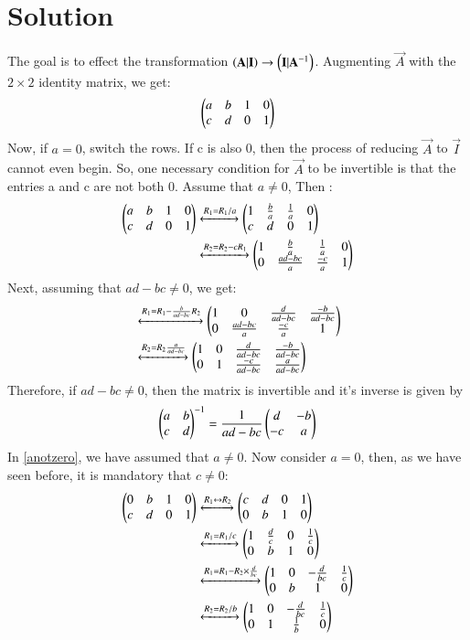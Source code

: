 \documentclass[journal,12pt,twocolumn]{IEEEtran}
\begin{document}
\section{Solution}
The goal is to effect the transformation $\left(\mathbf{A}|\mathbf{I}\right) \rightarrow \left(\mathbf{I}|\mathbf{A}^{-1}\right)$. Augmenting $\vec{A}$ with the $2 \times 2$ identity matrix, we get:
\begin{align}
 \begin{pmatrix}a & b & 1 & 0 \\ c & d & 0 & 1\end{pmatrix} 
\end{align}
Now, if $a = 0$, switch the rows. If c is also 0, then the process of reducing $\vec{A}$ to $\vec{I}$ cannot even begin. So, one necessary condition for $\vec{A}$ to be invertible is that the entries a and c are not both 0. Assume that $a \neq 0$, Then :
\begin{align}
     \label{anotzero}\begin{pmatrix}a & b & 1 & 0 \\ c & d & 0 & 1\end{pmatrix} &\xleftrightarrow{R_1 
= R_1/a} \begin{pmatrix}1 & \frac{b}{a} & \frac{1}{a} & 0 \\ c & d & 0 & 1\end{pmatrix}\\
&\xleftrightarrow{R_2 = R_2 - c R_1} \begin{pmatrix}1 & \frac{b}{a} & \frac{1}{a} & 0 \\ 0 & \frac{ad-bc}{a} & \frac{-c}{a} & 1\end{pmatrix}
\end{align}
Next, assuming that $ad - bc \neq 0$, we get:
\begin{align}
    &\xleftrightarrow{R_1 = R_1 - \frac{b}{ad-bc} R_2} \begin{pmatrix}1 & 0 & \frac{d}{ad-bc} & \frac{-b}{ad-bc} \\ 0 & \frac{ad-bc}{a} & \frac{-c}{a} & 1\end{pmatrix}\\
    &\xleftrightarrow{R_2 = R_2\frac{a}{ad-bc}} \begin{pmatrix}1 & 0 & \frac{d}{ad-bc} & \frac{-b}{ad-bc} \\ 0 & 1 & \frac{-c}{ad-bc} & \frac{a}{ad-bc}\end{pmatrix}
\end{align}
Therefore, if $ad - bc \neq 0$, then the matrix is invertible and it's inverse is given by 
\begin{align}
    \begin{pmatrix}a & b \\ c  & d\end{pmatrix}^{-1} = \frac{1}{ad-bc}\begin{pmatrix}d & -b \\ -c  & a\end{pmatrix}
\end{align}
In \eqref{anotzero}, we have assumed that $a \neq 0$. Now consider $a = 0$, then, as we have seen before, it is mandatory that $c \neq 0$:
\begin{align}
    \begin{pmatrix}0 & b & 1 & 0 \\ c & d & 0 & 1\end{pmatrix} &\xleftrightarrow{R_1\leftrightarrow R_2}  \begin{pmatrix}c & d & 0 & 1 \\ 0 & b & 1 & 0\end{pmatrix} \\
    &\xleftrightarrow{R_1 = R_1/c}\begin{pmatrix}1 & \frac{d}{c} & 0 & \frac{1}{c} \\ 0 & b & 1 & 0\end{pmatrix} \\
    &\xleftrightarrow{R_1 = R_1 - R_2\times \frac{d}{bc}}\begin{pmatrix}1 & 0 & -\frac{d}{bc} & \frac{1}{c} \\ 0 & b & 1 & 0\end{pmatrix}\\
    &\xleftrightarrow{R_2 = R_2/b}\begin{pmatrix}1 & 0 & -\frac{d}{bc} & \frac{1}{c} \\ 0 & 1 & \frac{1}{b} & 0\end{pmatrix}
\end{align}
\end{document}
